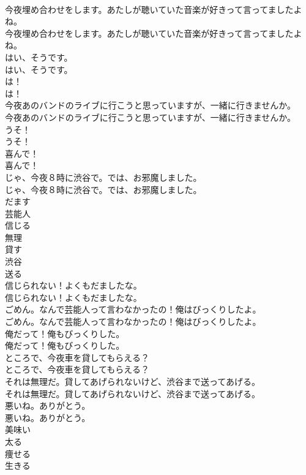 \documentclass[8pt]{extreport}
\begin{document}
\begin{CJK}{UTF8}{min}
\\	今夜埋め合わせをします。あたしが聴いていた音楽が好きって言ってましたよね。	
\\	今夜埋め合わせをします。あたしが聴いていた音楽が好きって言ってましたよね。 
\\	はい、そうです。	
\\	はい、そうです。 
\\	は！	
\\	は！ 
\\	今夜あのバンドのライブに行こうと思っていますが、一緒に行きませんか。	
\\	今夜あのバンドのライブに行こうと思っていますが、一緒に行きませんか。 
\\	うそ！	
\\	うそ！ 
\\	喜んで！	
\\	喜んで！ 
\\	じゃ、今夜８時に渋谷で。では、お邪魔しました。	
\\	じゃ、今夜８時に渋谷で。では、お邪魔しました。 
\\	だます
\\	芸能人
\\	信じる
\\	無理
\\	貸す
\\	渋谷
\\	送る
\\	信じられない！よくもだましたな。	
\\	信じられない！よくもだましたな。 
\\	ごめん。なんで芸能人って言わなかったの！俺はびっくりしたよ。	
\\	ごめん。なんで芸能人って言わなかったの！俺はびっくりしたよ。 
\\	俺だって！俺もびっくりした。	
\\	俺だって！俺もびっくりした。 
\\	ところで、今夜車を貸してもらえる？	
\\	ところで、今夜車を貸してもらえる？ 
\\	それは無理だ。貸してあげられないけど、渋谷まで送ってあげる。	
\\	それは無理だ。貸してあげられないけど、渋谷まで送ってあげる。 
\\	悪いね。ありがとう。	
\\	悪いね。ありがとう。 
\\	美味い
\\	太る
\\	痩せる
\\	生きる

\end{CJK}
\end{document}
